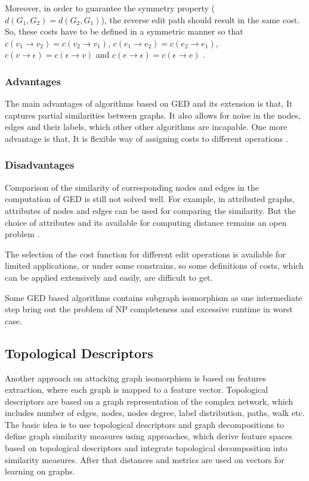 Moreover, in order to guarantee the symmetry property ($d(G_1,G_2)=d(G_2,G_1)$), the reverse edit path should result in the same cost. So, these costs have to be defined in a symmetric manner so that $c(v_1 \rightarrow v_2) = c(v_2 \rightarrow v_1)$, $c(e_1 \rightarrow e_2) = c(e_2 \rightarrow e_1) $, $c(v \rightarrow \epsilon) = c(\epsilon \rightarrow v)$ and $c(e \rightarrow \epsilon) = c(\epsilon \rightarrow e)$ \citep{Lerouge2016}.

\subsubsection{Advantages} 
The main advantages of algorithms based on GED and its extension is that, It captures partial similarities between graphs. It also allows for noise in the nodes, edges and their labels, which other other algorithms are incapable. One more advantage is that, It is flexible way of assigning costs to different operations \citep{Koutra2015}.

\subsubsection{Disadvantages}
Comparison of the similarity of corresponding nodes and edges in the computation of GED is still not solved well. For example, in attributed graphs, attributes of nodes and edges can be used for comparing the similarity. But the choice of  attributes and its available for computing distance remains an open problem \citep{Gao2010}. 

The selection of the cost function for different edit operations is available for limited applications, or under some constrains, so
some definitions of costs, which can be applied extensively and easily, are difficult to get.

Some GED based algorithms contains subgraph isomorphism as one intermediate step bring out the problem of NP completeness and excessive runtime in worst case.

\subsection{Topological Descriptors}

Another approach on attacking graph isomorphism is based on features extraction, where each graph is mapped to a feature vector. Topological descriptors are based on a graph representation of the complex network, which includes number of edges, nodes, nodes degree, label distribution, paths, walk etc. The basic idea is to use topological descriptors and graph decompositions to define graph similarity measures using approaches, which derive feature spaces based on topological descriptors  and integrate topological decomposition into similarity measures. After that distances and metrics are used on vectors for learning on graphs.

